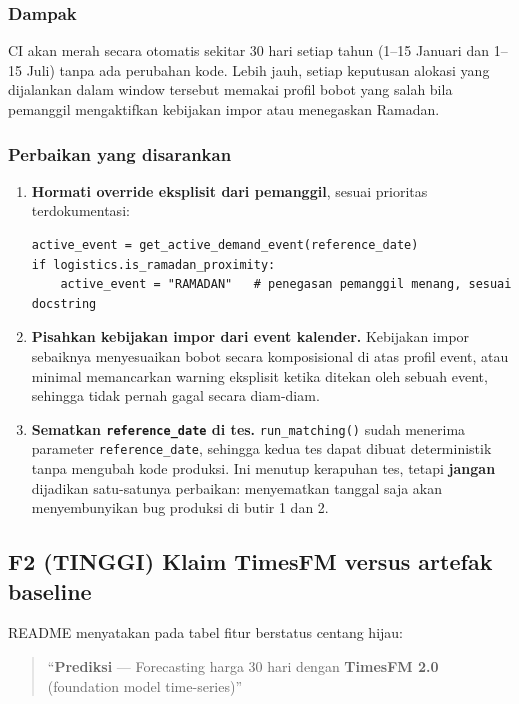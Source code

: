 \documentclass[11pt,a4paper]{article}
\newcommand{\code}[1]{\texttt{\small #1}}
\newcommand{\sevH}{\textcolor{sevhigh}{\textbf{TINGGI}}}
\begin{document}
\subsubsection*{Dampak}

CI akan merah secara otomatis sekitar 30 hari setiap tahun (1--15 Januari dan 1--15 Juli) tanpa
ada perubahan kode. Lebih jauh, setiap keputusan alokasi yang dijalankan dalam window tersebut
memakai profil bobot yang salah bila pemanggil mengaktifkan kebijakan impor atau menegaskan
Ramadan.

\subsubsection*{Perbaikan yang disarankan}

\begin{enumerate}
  \item \textbf{Hormati override eksplisit dari pemanggil}, sesuai prioritas terdokumentasi:
\begin{lstlisting}
active_event = get_active_demand_event(reference_date)
if logistics.is_ramadan_proximity:
    active_event = "RAMADAN"   # penegasan pemanggil menang, sesuai docstring
\end{lstlisting}
  \item \textbf{Pisahkan kebijakan impor dari event kalender.} Kebijakan impor sebaiknya
        menyesuaikan bobot secara komposisional di atas profil event, atau minimal memancarkan
        warning eksplisit ketika ditekan oleh sebuah event, sehingga tidak pernah gagal secara
        diam-diam.
  \item \textbf{Sematkan \code{reference\_date} di tes.} \code{run\_matching()} sudah menerima
        parameter \code{reference\_date}, sehingga kedua tes dapat dibuat deterministik tanpa
        mengubah kode produksi. Ini menutup kerapuhan tes, tetapi \textbf{jangan} dijadikan
        satu-satunya perbaikan: menyematkan tanggal saja akan menyembunyikan bug produksi di
        butir 1 dan 2.
\end{enumerate}

\subsection{F2 (\sevH) Klaim TimesFM versus artefak baseline}
\label{sec:f2}

README menyatakan pada tabel fitur berstatus centang hijau:

\begin{quote}
``\textbf{Prediksi} — Forecasting harga 30 hari dengan \textbf{TimesFM 2.0} (foundation model
time-series)''
\end{quote}
\end{document}
